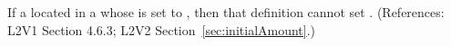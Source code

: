 If a \Species located in a \Compartment whose  is
set to , then that \Species definition cannot set
.  (References: L2V1 Section 4.6.3; L2V2
Section~\ref{sec:initialAmount}.)
